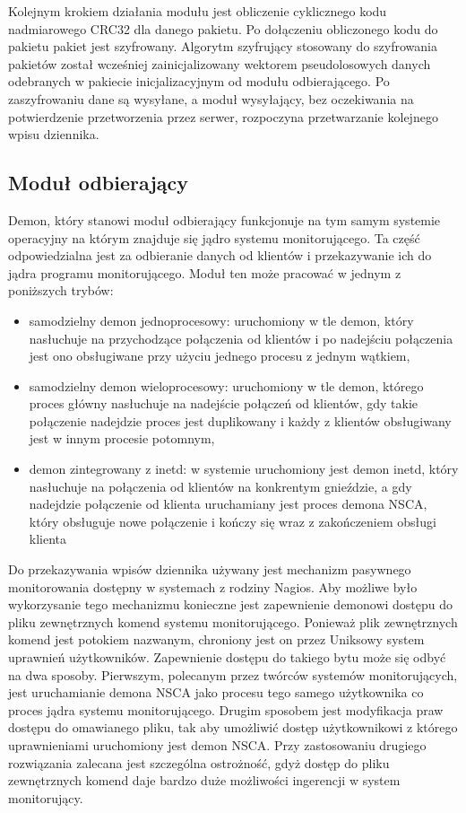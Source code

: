 Kolejnym krokiem działania modułu jest obliczenie cyklicznego kodu
nadmiarowego CRC32 dla danego pakietu. Po dołączeniu obliczonego kodu
do pakietu pakiet jest szyfrowany. Algorytm szyfrujący stosowany do
szyfrowania pakietów został wcześniej zainicjalizowany wektorem
pseudolosowych danych odebranych w pakiecie inicjalizacyjnym od modułu
odbierającego. Po zaszyfrowaniu dane są wysyłane, a moduł wysyłający,
bez oczekiwania na potwierdzenie przetworzenia przez serwer,
rozpoczyna przetwarzanie kolejnego wpisu dziennika.

\subsection[Moduł odbierający][Moduł odbierający]{Moduł odbierający}

Demon, który stanowi moduł odbierający funkcjonuje na tym samym
systemie operacyjny na którym znajduje się jądro systemu
monitorującego. Ta część odpowiedzialna jest za odbieranie danych od
klientów i przekazywanie ich do jądra programu monitorującego. Moduł
ten może pracować w jednym z poniższych trybów:

\begin{itemize}
\item samodzielny demon jednoprocesowy: uruchomiony w tle demon, który
  nasłuchuje na przychodzące połączenia od klientów i po nadejściu
  połączenia jest ono obsługiwane przy użyciu jednego procesu z jednym
  wątkiem,
\item samodzielny demon wieloprocesowy: uruchomiony w tle demon,
  którego proces główny nasłuchuje na nadejście połączeń od klientów,
  gdy takie połączenie nadejdzie proces jest duplikowany i każdy z
  klientów obsługiwany jest w innym procesie potomnym,
\item demon zintegrowany z inetd: w systemie uruchomiony jest demon
  inetd, który nasłuchuje na połączenia od klientów na konkrentym
  gnieździe, a gdy nadejdzie połączenie od klienta uruchamiany jest
  proces demona NSCA, który obsługuje nowe połączenie i kończy się
  wraz z zakończeniem obsługi klienta
\end{itemize}

Do przekazywania wpisów dziennika używany jest mechanizm pasywnego
monitorowania dostępny w systemach z rodziny Nagios. Aby możliwe było
wykorzysanie tego mechanizmu konieczne jest zapewnienie demonowi
dostępu do pliku zewnętrznych komend systemu monitorującego. Ponieważ
plik zewnętrznych komend jest potokiem nazwanym, chroniony jest on
przez Uniksowy system uprawnień użytkowników. Zapewnienie dostępu do
takiego bytu może się odbyć na dwa sposoby. Pierwszym, polecanym przez
twórców systemów monitorujących, jest uruchamianie demona NSCA jako
procesu tego samego użytkownika co proces jądra systemu
monitorującego. Drugim sposobem jest modyfikacja praw dostępu do
omawianego pliku, tak aby umożliwić dostęp użytkownikowi z którego
uprawnieniami uruchomiony jest demon NSCA. Przy zastosowaniu drugiego
rozwiązania zalecana jest szczególna ostrożność, gdyż dostęp do pliku
zewnętrznych komend daje bardzo duże możliwości ingerencji w system
monitorujący.

